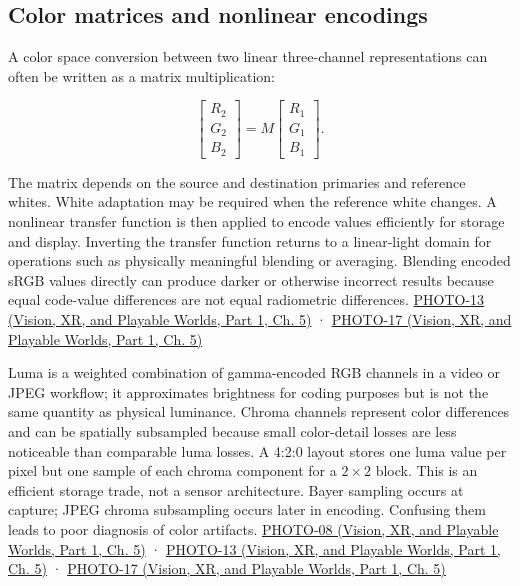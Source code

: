 \subsection{Color matrices and nonlinear encodings}\label{03-visual-computing-i-ch004-color-matrices-and-nonlinear-encodings}

\hypertarget{03-visual-computing-i-ch004-color-matrices-and-nonlinear-encodings}{}

A color space conversion between two linear three-channel representations can often be written as a matrix multiplication:

\[
\begin{bmatrix}R_2\\G_2\\B_2\end{bmatrix}
=M\begin{bmatrix}R_1\\G_1\\B_1\end{bmatrix}.
\]

The matrix depends on the source and destination primaries and reference whites. White adaptation may be required when the reference white changes. A nonlinear transfer function is then applied to encode values efficiently for storage and display. Inverting the transfer function returns to a linear-light domain for operations such as physically meaningful blending or averaging. Blending encoded sRGB values directly can produce darker or otherwise incorrect results because equal code-value differences are not equal radiometric differences. \href{../07-Vision-XR-and-Playable-Worlds-P01/main.pdf\#nameddest=04-visual-computing-ii-ch036-photo-13---photography-session-13}{PHOTO-13 (Vision, XR, and Playable Worlds, Part 1, Ch. 5)} · \href{../07-Vision-XR-and-Playable-Worlds-P01/main.pdf\#nameddest=04-visual-computing-ii-ch036-photo-17---photography-session-17}{PHOTO-17 (Vision, XR, and Playable Worlds, Part 1, Ch. 5)}

Luma is a weighted combination of gamma-encoded RGB channels in a video or JPEG workflow; it approximates brightness for coding purposes but is not the same quantity as physical luminance. Chroma channels represent color differences and can be spatially subsampled because small color-detail losses are less noticeable than comparable luma losses. A 4:2:0 layout stores one luma value per pixel but one sample of each chroma component for a \(2\times2\) block. This is an efficient storage trade, not a sensor architecture. Bayer sampling occurs at capture; JPEG chroma subsampling occurs later in encoding. Confusing them leads to poor diagnosis of color artifacts. \href{../07-Vision-XR-and-Playable-Worlds-P01/main.pdf\#nameddest=04-visual-computing-ii-ch036-photo-08---photography-session-08}{PHOTO-08 (Vision, XR, and Playable Worlds, Part 1, Ch. 5)} · \href{../07-Vision-XR-and-Playable-Worlds-P01/main.pdf\#nameddest=04-visual-computing-ii-ch036-photo-13---photography-session-13}{PHOTO-13 (Vision, XR, and Playable Worlds, Part 1, Ch. 5)} · \href{../07-Vision-XR-and-Playable-Worlds-P01/main.pdf\#nameddest=04-visual-computing-ii-ch036-photo-17---photography-session-17}{PHOTO-17 (Vision, XR, and Playable Worlds, Part 1, Ch. 5)}

